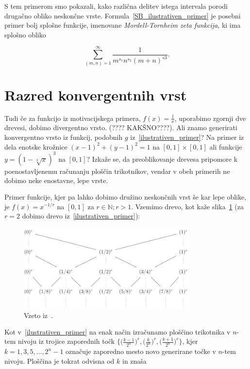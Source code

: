 \documentclass[a4paper, 12pt, titlepage]{article}
\begin{document}
S tem primerom smo pokazali, kako različna delitev istega intervala porodi drugačno obliko neskončne vrste. Formula~\ref{SB_ilustrativen_primer} je posebni primer bolj splošne funkcije, imenovane \emph{Mordell-Tornheim zeta funkcija}, ki ima splošno obliko

\begin{equation}
    \sum_{(m,n)=1}^{\infty} \frac{1}{m^{s_1}n^{s_2}(m+n)^{s3}}\text{.}
\end{equation}


\section{Razred konvergentnih vrst}

Tudi če za funkcijo iz motivacijskega primera, $ f(x) = \frac{1}{x} $, uporabimo zgornji dve drevesi, dobimo divergentno vrsto. (???? KAKŠNO????). Ali znamo generirati konvergentno vrsto iz funkcij, podobnih $ g $ iz~\ref{ilustrativen_primer}? Na primer iz dela enotske krožnice $ (x-1)^2+(y-1)^2=1 $ na $ [0,1] \times [0,1]$ ali funkcije $ y = (1-\sqrt[3]{x})^3 $ na $ [0,1] $? Izkaže se, da preoblikovanje drevesa pripomore k poenostavljenemu računanju ploščin trikotnikov, vendar v obeh primerih ne dobimo neke enostavne, lepe vrste.

Primer funkcije, kjer pa lahko dobimo družino neskončnih vrst še kar lepe oblike, je $ f(x)=x^{-1/r} $ na $ [0,1] $ za $ r \in \mathbb{N}; r > 1 $. Vzemimo drevo, kot kaže slika~\ref{r_drevo} (za $ r = 2 $ dobimo drevo iz~\ref{ilustrativen_primer}):

\begin{figure}[h!]
    \centering
    \includegraphics[width=0.8\textwidth]{slike/r_drevo.png}
    \caption{Vzeto iz~\cite{osnovni_clanek}.}
    \label{r_drevo}
\end{figure}

Kot v~\ref{ilustrativen_primer} na enak način izračunamo ploščino trikotnika v $ n $-tem nivoju iz trojice zaporednih točk $ \{\bigl(\frac{k-1}{2^n}\bigr)^r, \bigl(\frac{k}{2^n}\bigr)^r, \bigl(\frac{k+1}{2^n}\bigr)^r\} $, kjer $ k = 1, 3, 5, \ldots, 2^n-1 $ označuje zaporedno mesto novo generirane točke v $ n $-tem nivoju. Ploščina je tokrat odvisna od $ k $ in znaša
\end{document}
